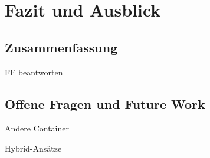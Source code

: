 \chapter{Fazit und Ausblick}


\section{Zusammenfassung}
FF beantworten


\section{Offene Fragen und Future Work}

Andere Container

Hybrid-Ansätze